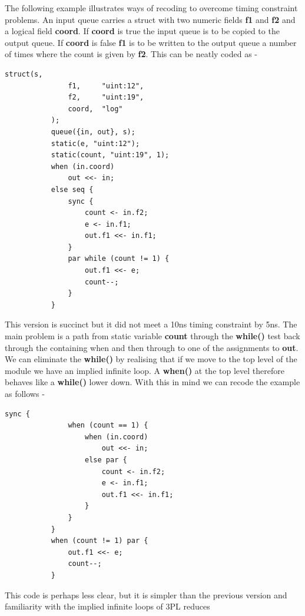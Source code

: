         The following example illustrates ways of recoding to overcome
        timing constraint problems. An input queue carries a struct with
        two numeric fields {\bf f1} and {\bf f2} and a logical field
        {\bf coord}. If {\bf coord} is true the input queue is to be copied
        to the output queue. If {\bf coord} is false {\bf f1} is to be written
        to the output queue a number of times where the count is given by
        {\bf f2}. This can be neatly coded as -
        \begin{lstlisting}[gobble=8, language=threepl]
           struct(s,
               f1,     "uint:12",
               f2,     "uint:19",
               coord,  "log"
           );
           queue({in, out}, s);
           static(e, "uint:12");
           static(count, "uint:19", 1);
           when (in.coord)
               out <<- in;
           else seq {
               sync {
                   count <- in.f2;
                   e <- in.f1;
                   out.f1 <<- in.f1;
               }
               par while (count != 1) {
                   out.f1 <<- e;
                   count--;
               }
           }
        \end{lstlisting}
        This version is succinct but it did not meet a 10ns timing
        constraint by 5ns. The main problem is a path from static variable
        {\bf count} through the {\bf while()} test back through the containing
        when and then through to one of the assignments to {\bf out}. We can
        eliminate the {\bf while()} by realising that if we move to the top
        level of the module we have an implied infinite loop. A {\bf when()}
        at the top level therefore behaves like a {\bf while()} lower down.
        With this in mind we can recode the example as follows -
        \begin{lstlisting}[gobble=8, language=threepl]
           sync {
               when (count == 1) {
                   when (in.coord)
                       out <<- in;
                   else par {
                       count <- in.f2;
                       e <- in.f1;
                       out.f1 <<- in.f1;
                   }
               }
           }
           when (count != 1) par {
               out.f1 <<- e;
               count--;
           }
        \end{lstlisting}
        This code is perhaps less clear, but it is simpler than the previous
        version and familiarity with the implied infinite loops of 3PL reduces
